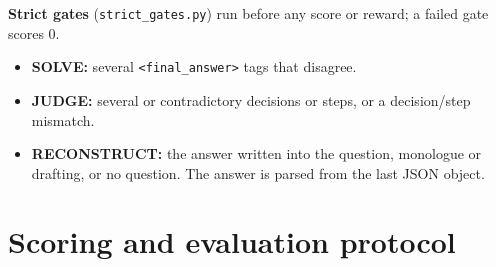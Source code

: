 \documentclass[10pt,a4paper]{article}
\begin{document}
\textbf{Strict gates} (\texttt{strict\_gates.py}) run before any score or reward; a failed gate scores 0.
\begin{itemize}
\item \textbf{SOLVE:} several \texttt{<final\_answer>} tags that disagree.
\item \textbf{JUDGE:} several or contradictory decisions or steps, or a decision/step mismatch.
\item \textbf{RECONSTRUCT:} the answer written into the question, monologue or drafting, or no question. The answer
      is parsed from the last JSON object.
\end{itemize}

\section{Scoring and evaluation protocol}
\label{sec:scoring}
\end{document}
